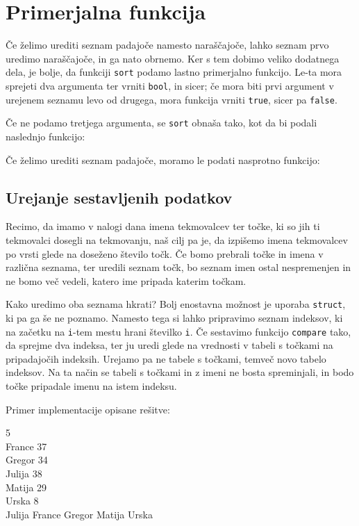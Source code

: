 \section{Primerjalna funkcija}

Če želimo urediti seznam padajoče namesto naraščajoče, lahko seznam prvo uredimo
naraščajoče, in ga nato obrnemo. Ker s tem dobimo veliko dodatnega dela, je
bolje, da funkciji \verb+sort+ podamo lastno primerjalno funkcijo. Le-ta mora
sprejeti dva argumenta ter vrniti \verb+bool+, in sicer; če mora biti prvi
argument v urejenem seznamu levo od drugega, mora funkcija vrniti \verb+true+,
sicer pa \verb+false+.

Če ne podamo tretjega argumenta, se \verb+sort+ obnaša tako, kot da bi podali
naslednjo funkcijo:


Če želimo urediti seznam padajoče, moramo le podati nasprotno funkcijo:


\subsection{Urejanje sestavljenih podatkov}

Recimo, da imamo v nalogi dana imena tekmovalcev ter točke, ki so jih ti
tekmovalci dosegli na tekmovanju, naš cilj pa je, da izpišemo imena tekmovalcev
po vrsti glede na doseženo število točk. Če bomo prebrali točke in imena v
različna seznama, ter uredili seznam točk, bo seznam imen ostal nespremenjen in
ne bomo več vedeli, katero ime pripada katerim točkam.

Kako uredimo oba seznama hkrati? Bolj enostavna možnost je uporaba \verb+struct+,
ki pa ga še ne poznamo. Namesto tega si lahko pripravimo seznam indeksov, ki
na začetku na \verb+i+-tem mestu hrani številko \verb+i+. Če sestavimo funkcijo
\verb+compare+ tako, da sprejme dva indeksa, ter ju uredi glede na vrednosti
v tabeli s točkami na pripadajočih indeksih. Urejamo pa ne tabele s točkami,
temveč novo tabelo indeksov.
Na ta način se tabeli s točkami in z imeni ne bosta spreminjali,
in bodo točke pripadale imenu na istem indeksu.

\begin{examples}

Primer implementacije opisane rešitve:


\begin{inout}
  5 \\
  France 37 \\
  Gregor 34 \\
  Julija 38 \\
  Matija 29 \\
  Urska 8 \\
  \tcblower
  Julija
  France
  Gregor
  Matija
  Urska
\end{inout}

\end{examples}

